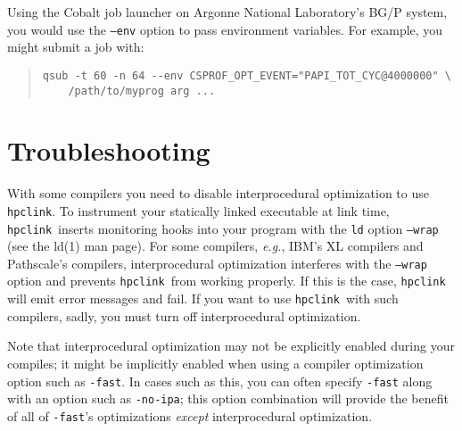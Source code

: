 \documentclass[12pt]{article}
\newcommand{\hpclink}{\texttt{hpclink}}
\begin{document}
Using the Cobalt job launcher on Argonne National Laboratory's BG/P system, you would use  the {\tt --env} option to pass environment
variables.  For example, you might submit a job with:

\begin{quote}
\begin{verbatim}
qsub -t 60 -n 64 --env CSPROF_OPT_EVENT="PAPI_TOT_CYC@4000000" \
    /path/to/myprog arg ...
\end{verbatim}
\end{quote}

\section{Troubleshooting}

With some compilers you need to disable interprocedural
optimization to use \hpclink.  To instrument your statically linked executable at link time, \hpclink\ inserts monitoring hooks into  your program
with the {\tt ld} option {\tt --wrap} (see the ld(1) man page).  For some compilers, {\em e.g.}, IBM's XL compilers and Pathscale's compilers,
interprocedural optimization interferes with the {\tt --wrap} option
and prevents \hpclink\ from working properly. If this is the case, \hpclink{} will emit error messages and fail. If you want to use \hpclink\ with such compilers, sadly, you must turn off interprocedural optimization. 

Note that interprocedural optimization may not be explicitly enabled during your compiles; it might be implicitly enabled when using a compiler optimization option such as {\tt -fast}. In cases such as this, you can often specify {\tt -fast} along with an option such as {\tt -no-ipa}; this option combination will provide the benefit of all of {\tt -fast}'s optimizations {\em except} interprocedural optimization.
\end{document}
